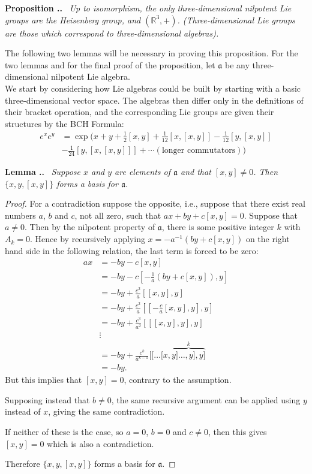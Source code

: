 \documentclass[honours]{UNSWthesis}
\newcommand{\R}{\mathbb{R}}
\newcommand{\1}{\mathbf{e}_{1}}
\newcommand{\2}{\mathbf{e}_{3}}
\newcommand{\3}{\mathbf{e}_{3}}
\newcounter{Item}[section]
\newenvironment{Proposition}{\medskip
                            \refstepcounter{Item}
                            \noindent
                           {\bf Proposition \thesection.\theItem.}\ %
                            \begingroup \sl}
                           {\endgroup\medskip}
\newenvironment{Lemma}{\medskip
                            \refstepcounter{Item}
                            \noindent
                           {\bf Lemma \thesection.\theItem.}\ %
                            \begingroup \sl}
                           {\endgroup\medskip}
\begin{document}
\begin{Proposition}\label{Three-dim}
Up to isomorphism, the only three-dimensional nilpotent Lie groups are the Heisenberg group, and $(\R^{3},+)$. (Three-dimensional Lie groups are those which correspond to three-dimensional algebras).
\end{Proposition}

The following two lemmas will be necessary in proving this proposition. For the two lemmas and for the final proof of the proposition, let $\mathfrak{a}$ be any three-dimensional nilpotent Lie algebra. \\
We start by considering how Lie algebras could be built by starting with a basic three-dimensional vector space. The algebras then differ only in the definitions of their bracket operation, and the corresponding Lie groups are given their structures by the BCH Formula:
\begin{align*}
e^{x}e^{y} &= \exp\big( x+y+\frac{1}{2}[x,y]+\frac{1}{12}[x,[x,y]]-\frac{1}{12}[y,[x,y]] \\
&-\frac{1}{24}[y,[x,[x,y]]]+\cdots (\text{longer commutators}) \big)
\end{align*}


\begin{Lemma}
Suppose $x$ and $y$ are elements of $\mathfrak{a}$ and that $[x,y] \neq 0$. Then $\{x,y,[x,y]\}$ forms a basis for $\mathfrak{a}$.
\end{Lemma}

\begin{proof}
For a contradiction suppose the opposite, i.e., suppose that there exist real numbers $a$, $b$ and $c$, not all zero, such that $ax+by+c[x,y]=0$. Suppose that $a \neq 0$. Then by the nilpotent property of $\mathfrak{a}$, there is some positive integer $k$ with $A_{k}=0$. Hence by recursively applying $x=-a^{-1}(by+c[x,y])$ on the right hand side in the following relation, the last term is forced to be zero:
\begin{align*}
ax &= -by-c[x,y]\\
&=-by-c[-\frac{1}{a}(by+c[x,y]),y] \\
&= -by+\frac{c^{2}}{a}[[x,y],y] \\
&= -by+\frac{c^{2}}{a}[[-\frac{c}{a}[x,y],y],y] \\
&= -by+\frac{c^{3}}{a^{2}}[[[x,y],y],y] \\
& \vdots \\
&= -by+\frac{c^{k}}{a^{k-1}}[[\ldots[x,\overbrace{y]\ldots ,y],y]}^{k} \\
&= -by.
\end{align*}
But this implies that $[x,y]=0$, contrary to the assumption.

Supposing instead that $b \neq 0$, the same recursive argument can be applied using $y$ instead of $x$, giving the same contradiction. 

If neither of these is the case, so $a=0$, $b=0$ and $c \neq 0$, then this gives $[x,y]=0$ which is also a contradiction.

Therefore $\{x,y,[x,y]\}$ forms a basis for $\mathfrak{a}$.
\end{proof}
\end{document}

